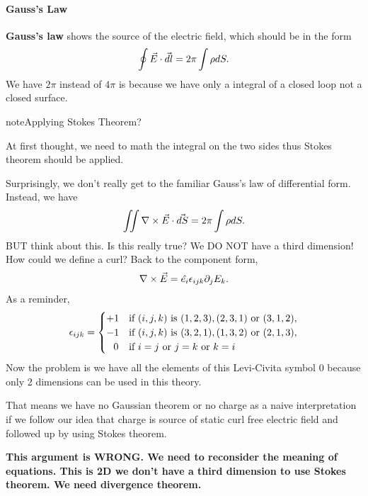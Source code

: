 \documentclass[letterpaper,10pt,english]{sphinxmanual}
\begin{document}
\paragraph{Gauss's Law}
\label{fun:gauss-s-law}
\textbf{Gauss's law} shows the source of the electric field, which should be in the form
\begin{gather}
\begin{split}\oint \vec E\cdot \vec {dl} = 2\pi \int \rho dS.\end{split}\notag
\end{gather}
We have \(2\pi\) instead of \(4\pi\) is because we have only a integral of a closed loop not a closed surface.

\begin{notice}{note}{Applying Stokes Theorem?}

At first thought, we need to math the integral on the two sides thus Stokes theorem should be applied.

Surprisingly, we don't really get to the familiar Gauss's law of differential form. Instead, we have
\begin{gather}
\begin{split}\iint \nabla \times \vec E \cdot \vec{dS} = 2\pi \int \rho dS.\end{split}\notag
\end{gather}
BUT think about this. Is this really true? We DO NOT have a third dimension! How could we define a curl? Back to the component form,
\begin{gather}
\begin{split}\nabla \times \vec E = \hat{e_i} \epsilon_{ijk} \partial_j E_k.\end{split}\notag
\end{gather}
As a reminder,
\begin{gather}
\begin{split}\epsilon_{ijk} = \begin{cases}
+1 & \text{if } (i,j,k) \text{ is } (1,2,3), (2,3,1) \text{ or } (3,1,2), \\
-1 & \text{if } (i,j,k) \text{ is } (3,2,1), (1,3,2) \text{ or } (2,1,3), \\
\;\;\,0 & \text{if }i=j \text{ or } j=k \text{ or } k=i
\end{cases}\end{split}\notag
\end{gather}
Now the problem is we have all the elements of this Levi-Civita symbol 0 because only 2 dimensions can be used in this theory.

That means we have no Gaussian theorem or no charge as a naive interpretation if we follow our idea that charge is source of static curl free electric field and followed up by using Stokes theorem.

\textbf{This argument is WRONG. We need to reconsider the meaning of equations. This is 2D we don't have a third dimension to use Stokes theorem. We need divergence theorem.}
\end{notice}
\end{document}
